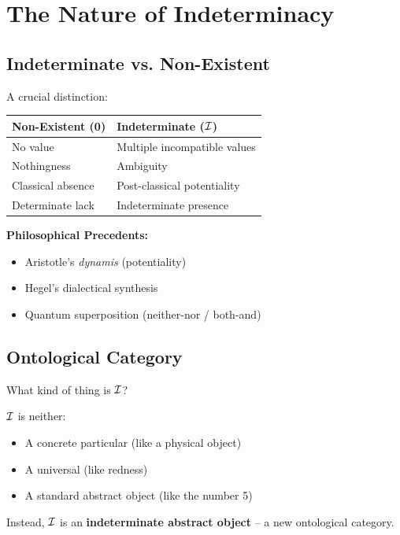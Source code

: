 \section{The Nature of Indeterminacy}

\subsection{Indeterminate vs. Non-Existent}

A crucial distinction:

\begin{center}
\begin{tabular}{|l|l|}
\hline
\textbf{Non-Existent (0)} & \textbf{Indeterminate ($\I$)} \\
\hline
No value & Multiple incompatible values \\
Nothingness & Ambiguity \\
Classical absence & Post-classical potentiality \\
Determinate lack & Indeterminate presence \\
\hline
\end{tabular}
\end{center}

\textbf{Philosophical Precedents:}
\begin{itemize}
    \item Aristotle's \textit{dynamis} (potentiality)
    \item Hegel's dialectical synthesis
    \item Quantum superposition (neither-nor / both-and)
\end{itemize}

\subsection{Ontological Category}

What kind of thing is $\I$?

\begin{proposition}[Category of $\I$]
$\I$ is neither:
\begin{itemize}
    \item A concrete particular (like a physical object)
    \item A universal (like redness)
    \item A standard abstract object (like the number 5)
\end{itemize}
Instead, $\I$ is an \textbf{indeterminate abstract object} -- a new ontological category.
\end{proposition}

